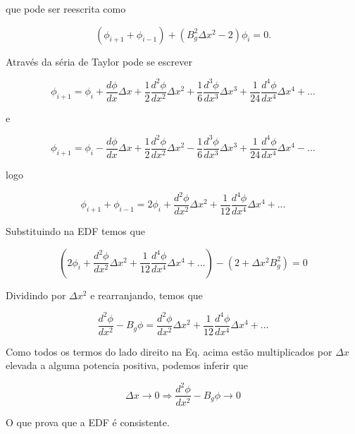 \documentclass{article}
\begin{document}
        que pode ser reescrita como

        \begin{equation}
            ( \phi_{i+1} + \phi_{i-1} )  + (B_g^2 \Delta x^2  -  2) \phi_i = 0.
        \end{equation}

        Através da séria de Taylor pode se escrever

        \begin{equation}
            \phi_{i+1} = \phi_{i}  + \frac{d\phi}{dx} \Delta x  +  \frac{1}{2}\frac{d^2\phi}{dx^2} \Delta x^2  +  \frac{1}{6}\frac{d^3\phi}{dx^3} \Delta x^3 + \frac{1}{24}\frac{d^4\phi}{dx^4} \Delta x^4 + ...
        \end{equation}

        e

        \begin{equation}
            \phi_{i+1} = \phi_{i}  - \frac{d\phi}{dx} \Delta x  +  \frac{1}{2}\frac{d^2\phi}{dx^2} \Delta x^2  -  \frac{1}{6}\frac{d^3\phi}{dx^3} \Delta x^3 + \frac{1}{24}\frac{d^4\phi}{dx^4} \Delta x^4 - ...
        \end{equation}

        logo

        \begin{equation}
            \phi_{i+1} + \phi_{i-1}    =     2\phi_{i}   +  \frac{d^2\phi}{dx^2} \Delta x^2  + \frac{1}{12}\frac{d^4\phi}{dx^4} \Delta x^4 + ...
        \end{equation}
        
        Substituindo na EDF temos que

        \begin{equation}
            (2\phi_{i}   +  \frac{d^2\phi}{dx^2} \Delta x^2  + \frac{1}{12}\frac{d^4\phi}{dx^4} \Delta x^4 + ...) - (2 + \Delta x^2 B_g^2 ) = 0
        \end{equation}

        Dividindo por $\Delta x^2$ e rearranjando, temos que 

        \begin{equation}
            \frac{d^2 \phi}{dx^2}  - B_g \phi = \frac{d^2\phi}{dx^2} \Delta x^2  + \frac{1}{12}\frac{d^4\phi}{dx^4} \Delta x^4 + ...
        \end{equation}

        Como todos os termos do lado direito na Eq. acima estão multiplicados por $\Delta x$ elevada a alguma potencia positiva, podemos inferir que
        
        \begin{equation}
            \Delta x \rightarrow 0      \Rightarrow       \frac{d^2 \phi}{dx^2}  - B_g \phi   \rightarrow 0
        \end{equation}

        O que prova que a EDF é consistente.
        
\end{document}

